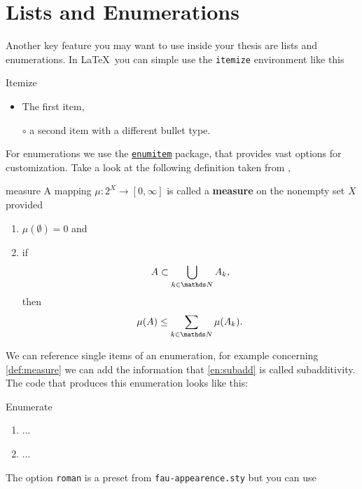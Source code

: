 \section{Lists and Enumerations}
Another key feature you may want to use inside your thesis are lists and enumerations.
In \LaTeX\ you can simple use the \lstinline[language={[LaTeX]TeX}]|itemize| environment 
like this
\begin{lstbox}[]{Itemize}
\begin{itemize}
\item The first item,
\item[$\circ$] a second item with a different bullet type.
\end{itemize}
\end{lstbox}
For enumerations we use the
\href{https://ctan.org/pkg/enumitem}{\texttt{enumitem}} package, that provides vast 
options for customization. Take a look at the following definition taken from 
\cite{FineProp2015},
\begin{definition}{}{measure}
A mapping $\mu:2^{X}\rightarrow[0,\infty]$ is called a {\bfseries measure} on the nonempty
set $X$ provided
\begin{enumerate}[roman, ref=\thetcbcounter (\roman*)]
\item $\mu(\emptyset) = 0$ and
\item\label{en:subadd} if
\begin{equation*}
A\subset \bigcup_{k\in\N}A_k,
\end{equation*}
then
\begin{equation*}
\mu(A)\leq \sum_{k\in\N}\mu(A_k).
\end{equation*}
\end{enumerate}
\end{definition}
We can reference single items of an enumeration, for example concerning \cref{def:measure} 
we can add the information that \cref{en:subadd} is called subadditivity. 
The code that produces this enumeration looks like this:
\begin{lstbox}{Enumerate}
\begin{enumerate}[roman, ref=\thetcbcounter (\roman*)]
\item ... %
\item\label{en:subadd} ... %
\end{enumerate} 
\end{lstbox}
The option \texttt{roman} is a preset from \texttt{fau-appearence.sty} but you can use 
